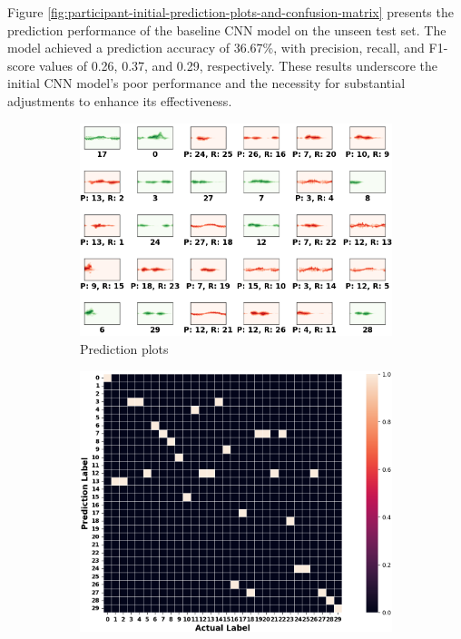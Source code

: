 \documentclass{l4proj}
\begin{document}
Figure \ref{fig:participant-initial-prediction-plots-and-confusion-matrix} presents the prediction performance of the baseline CNN model on the unseen test set. The model achieved a prediction accuracy of 36.67\%, with precision, recall, and F1-score values of 0.26, 0.37, and 0.29, respectively. These results underscore the initial CNN model's poor performance and the necessity for substantial adjustments to enhance its effectiveness.
\begin{figure}[h]
   \centering
   \begin{subfigure}{0.4\textwidth}
        \includegraphics[width=\textwidth]{images/participant-initial-test-prediction-plots.png}
        \caption{Prediction plots}
        \label{fig:participant-initial-test-prediction-plots}
    \end{subfigure}
    \qquad
    \begin{subfigure}{0.4\textwidth}
        \includegraphics[width=\textwidth]{images/participant-initial-test-confusion-matrix.png}

\end{subfigure}
\end{figure}
\end{document}
